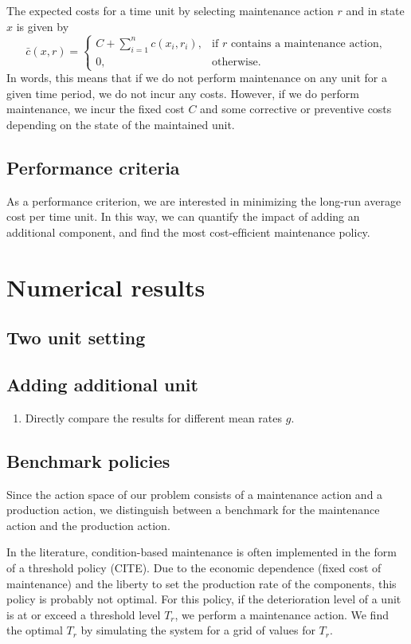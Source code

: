 \documentclass[a4paper,12pt]{article}
\begin{document}
The expected costs for a time unit by selecting maintenance action $r$ and in state $x$ is given by
$$
\bar{c}(x,r) = \begin{cases}
C + \sum_{i=1}^{n}c(x_i, r_i), &\text{if } r \text{ contains a maintenance action},\\
0, &\text{otherwise}.
\end{cases}
$$
In words, this means that if we do not perform maintenance on any unit for a given time period, we do not incur any costs. However, if we do perform maintenance, we incur the fixed cost $C$ and some corrective or preventive costs depending on the state of the maintained unit.
\subsection{Performance criteria}
As a performance criterion, we are interested in minimizing the long-run average cost per time unit. In this way, we can quantify the impact of adding an additional component, and find the most cost-efﬁcient maintenance policy. 

\section{Numerical results}

\subsection{Two unit setting}

\subsection{Adding additional unit}
\begin{enumerate}
	\item Directly compare the results for different mean rates $g$. 
\end{enumerate}

\subsection{Benchmark policies}
Since the action space of our problem consists of a maintenance action and a production action, we distinguish between a benchmark for the maintenance action and the production action. 

In the literature, condition-based maintenance is often implemented in the form of a threshold policy (CITE). Due to the economic dependence (fixed cost of maintenance) and the liberty to set the production rate of the components, this policy is probably not optimal. For this policy, if the deterioration level of a unit is at or exceed a threshold level $T_r$, we perform a maintenance action. We find the optimal $T_r$ by simulating the system for a grid of values for $T_r$.
\end{document}
